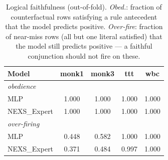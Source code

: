 \begin{table}[t]\centering
\small
\caption{Logical faithfulness (out-of-fold). \emph{Obed.}: fraction of counterfactual rows satisfying a rule antecedent that the model predicts positive. \emph{Over-fire}: fraction of near-miss rows (all but one literal satisfied) that the model still predicts positive --- a faithful conjunction should not fire on these.}
\label{tab:faithfulness}
\begin{tabular}{lcccc}
\toprule
Model & monk1 & monk3 & ttt & wbc \\
\midrule
\multicolumn{5}{l}{\textit{obedience}} \\
MLP & 1.000 & 1.000 & 1.000 & 1.000 \\
NEXS\_Expert & 1.000 & 1.000 & 1.000 & 1.000 \\
\midrule
\multicolumn{5}{l}{\textit{over-firing}} \\
MLP & 0.448 & 0.582 & 1.000 & 1.000 \\
NEXS\_Expert & 0.371 & 0.484 & 0.997 & 1.000 \\
\bottomrule
\end{tabular}
\end{table}